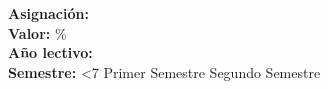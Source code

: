 \documentclass[11pt]{article}
\begin{document}
    \noindent
    \fontsize{12}{14}\selectfont
    \color{darkblue}
    \textbf{\institucion} \\
    \textbf{\nombrecurso} \\
    \fontsize{10}{12}\selectfont
    \color{black}
    \newline
    \textbf{Asignación: } \nombreproyecto \\
    \textbf{Valor: } \valorporcentual\% \\
    \textbf{Año lectivo: } {
        \the\year
    } \\
    \textbf{Semestre:} {
        \ifnum\month<7 Primer Semestre \else Segundo Semestre \fi
    } \\

    \newcommand{\colornota}{
        \ifnum\nota<\notareprobado red \else green \fi
    }

    
\end{document}
